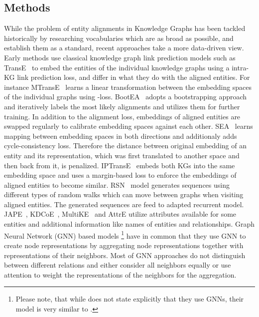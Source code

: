\documentclass[runningheads]{llncs}
\begin{document}
\subsection{Methods}
While the problem of entity alignments in Knowledge Graphs has been tackled historically by researching vocabularies which are as broad as possible, and establish them as a standard, recent approaches take a more data-driven view.
Early methods use classical knowledge graph link prediction models such as TransE~\cite{DBLP:conf/nips/BordesUGWY13} to embed the entities of the individual knowledge graphs using a intra-KG link prediction loss, and differ in what they do with the aligned entities.
For instance MTransE~\cite{DBLP:conf/ijcai/ChenTYZ17} learns a linear transformation between the embedding spaces of the individual graphs using -loss.
BootEA~\cite{sun2018bootstrapping} adopts a bootstrapping approach and iteratively labels the most likely alignments and utilizes them for further training. In addition to the alignment loss, embeddings of aligned entities are swapped regularly to calibrate embedding spaces against each other. SEA~\cite{pei2019semi} learns mapping between embedding spaces in both directions and additionaly adds cycle-consistency loss. Therefore the distance between original embedding of an entity and its representation, which was first translated to another space and then back from it, is penalized.
IPTransE~\cite{DBLP:conf/ijcai/ZhuXLS17} embeds both KGs into the same embedding space and uses a margin-based loss to enforce the embeddings of aligned entities to become similar.
RSN~\cite{DBLP:conf/icml/GuoSH19} model generates sequences using different types of random walks which can move between graphs when visiting aligned entities. The generated sequences are feed to adapted recurrent model.
JAPE~\cite{DBLP:conf/semweb/SunHL17}, KDCoE~\cite{DBLP:conf/ijcai/ChenTCSZ18}, MultiKE~\cite{DBLP:conf/ijcai/ZhangSHCGQ19} and AttrE \cite{DBLP:conf/aaai/TrisedyaQZ19} utilize attributes available for some entities and additional information like names of entities and relationships.
Graph Neural Network (GNN) based models
\cite{DBLP:conf/emnlp/WangLLZ18,DBLP:conf/acl/CaoLLLLC19,xu2019cross,DBLP:conf/ijcai/ZhuZ0TG19,anonymous2020deep}\footnote{Please note, that while \cite{DBLP:conf/ijcai/ZhuZ0TG19} does not state explicitly that they use GNNs, their model is very similar to \cite{velivckovic2017graph}.} have in common that they use GNN to create node representations by aggregating node representations together with representations of their neighbors.
Most of GNN approaches do not distinguish between different relations and either consider all neighbors equally \cite{DBLP:conf/emnlp/WangLLZ18,xu2019cross,anonymous2020deep} or use attention \cite{DBLP:conf/acl/CaoLLLLC19} to weight the representations of the neighbors for the aggregation.
\end{document}
